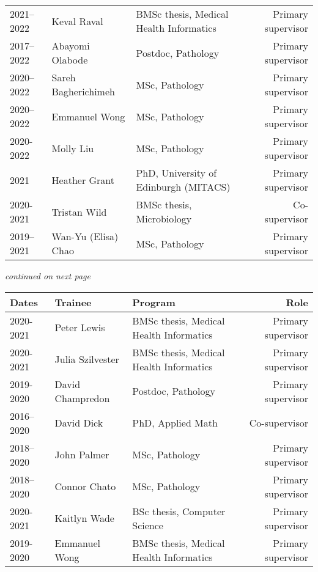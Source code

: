 \begin{tabular}{llp{2.5in}r}
2021--2022 & Keval Raval & BMSc thesis, Medical Health Informatics & Primary supervisor\\

2017--2022 & Abayomi Olabode & Postdoc, Pathology & Primary supervisor\\

2020--2022 & Sareh Bagherichimeh & MSc, Pathology & Primary supervisor\\

2020--2022 & Emmanuel Wong & MSc, Pathology & Primary supervisor\\
2020-2022 & Molly Liu & MSc, Pathology & Primary supervisor\\

2021 & Heather Grant & PhD, University of Edinburgh (MITACS) & Primary supervisor\\

2020-2021 & Tristan Wild & BMSc thesis, Microbiology & Co-supervisor\\

2019--2021 & Wan-Yu (Elisa) Chao & MSc, Pathology & Primary supervisor\\

\hline
\end{tabular}
\textit{continued on next page}


\begin{tabular}{llp{2.5in}r}
Dates & Trainee & Program & Role\\
\hline




2020-2021 & Peter Lewis & BMSc thesis, Medical Health Informatics & Primary supervisor\\
2020-2021 & Julia Szilvester & BMSc thesis, Medical Health Informatics & Primary supervisor\\

2019-2020 & David Champredon & Postdoc, Pathology & Primary supervisor\\

2016--2020 & David Dick & PhD, Applied Math & Co-supervisor\\

2018--2020 & John Palmer & MSc, Pathology & Primary supervisor\\

2018--2020 & Connor Chato & MSc, Pathology & Primary supervisor\\

2020-2021 & Kaitlyn Wade & BSc thesis, Computer Science & Primary supervisor\\
2019-2020 & Emmanuel Wong & BMSc thesis, Medical Health Informatics & Primary supervisor\\

\hline

\end{tabular}



